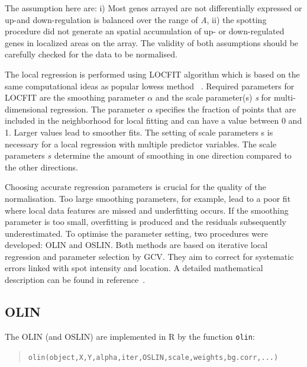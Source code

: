 \documentclass[a4paper,11pt]{article}
\begin{document}
 The assumption here are: i) Most genes arrayed are not differentially expressed or 
up-and down-regulation is balanced over the range of \emph{A},  ii) the spotting procedure did not generate an spatial accumulation of up- or down-regulated genes in localized areas on the array. 
The validity of both assumptions  should be carefully checked for the data to be normalised. 


The local regression is performed using LOCFIT algorithm which is based on the same 
computational ideas as popular lowess method~\cite{loader,cleveland} .  Required parameters for LOCFIT 
are the smoothing parameter $\alpha$  and the scale parameter(s) \emph{s}
for multi-dimensional regression.
The parameter $\alpha$  specifies the fraction of points that are included in the neighborhood for 
local fitting  and can have a  value between 0 and 1. Larger  values lead to smoother fits.  
The setting of scale parameters s is necessary for a local regression with multiple  
predictor variables. The scale parameters $s$  determine the  amount of smoothing in one direction 
compared to the other directions.   


Choosing accurate regression parameters is crucial for the quality of the normalisation. 
Too large smoothing parameters, for example, lead to a poor fit where local data features are missed
and underfitting occurs.  If the smoothing parameter is too small,  overfitting is produced and
the residuals subsequently underestimated. 
To optimise the parameter setting, two procedures were developed: OLIN and OSLIN. Both methods
are based  on iterative local regression and parameter selection by GCV.
 They aim to correct for systematic errors linked with spot intensity and location. A detailed mathematical description can be found in reference~\cite{toni}.


\subsection{OLIN}
The OLIN (and OSLIN) are implemented in R by the function \texttt{olin}:

\begin{quote}
\texttt{olin(object,X,Y,alpha,iter,OSLIN,scale,weights,bg.corr,...)}
\end{quote}
\end{document}
